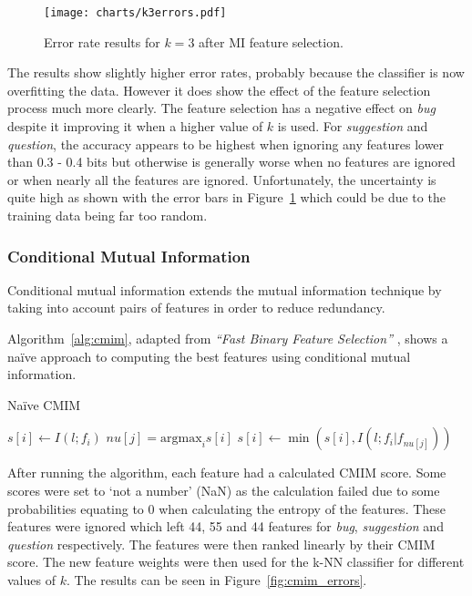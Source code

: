 \begin{figure}[h]
    \centering
    \texttt{[image: charts/k3errors.pdf]}
    \caption{Error rate results for $k = 3$ after MI feature selection.}
    \label{fig:mi_errors_k3}
\end{figure}

The results show slightly higher error rates, probably because the classifier is now overfitting the data. However it does show
the effect of the feature selection process much more clearly. The feature selection has a negative effect on \textit{bug}
despite it improving it when a higher value of $k$ is used. For \textit{suggestion} and \textit{question}, the accuracy appears
to be highest when ignoring any features lower than 0.3 - 0.4 bits but otherwise is generally worse when no features are ignored
or when nearly all the features are ignored. Unfortunately, the uncertainty is quite high as shown with the error bars in
Figure~\ref{fig:mi_errors_k3} which could be due to the training data being far too random.

\subsubsection{Conditional Mutual Information}
\label{sec:cmim}
Conditional mutual information extends the mutual information technique by taking into account pairs of features in order to
reduce redundancy.

Algorithm~\ref{alg:cmim}, adapted from \emph{``Fast Binary Feature Selection''} \cite{fast_binary_feature_selection}, shows a
na\"{i}ve approach to computing the best features using conditional mutual information.

\begin{algorithm}
    \caption{Na\"{i}ve CMIM}
    \label{alg:cmim}
    \begin{algorithmic}
            \STATE $s[i] \gets I(l;f_i)$
        \ENDFOR
            \STATE $nu[j] = \mathrm{argmax}_i s[i]$
                \STATE $s[i] \gets \min(s[i], I(l;f_i | f_{nu[j]}))$
            \ENDFOR
        \ENDFOR
    \end{algorithmic}
\end{algorithm}

After running the algorithm, each feature had a calculated CMIM score. Some scores were set to `not a number' (NaN) as the
calculation failed due to some probabilities equating to 0 when calculating the entropy of the features. These features were
ignored which left 44, 55 and 44 features for \textit{bug}, \textit{suggestion} and \textit{question} respectively. The features
were then ranked linearly by their CMIM score. The new feature weights were then used for the k-NN classifier for different
values of $k$. The results can be seen in Figure~\ref{fig:cmim_errors}.

